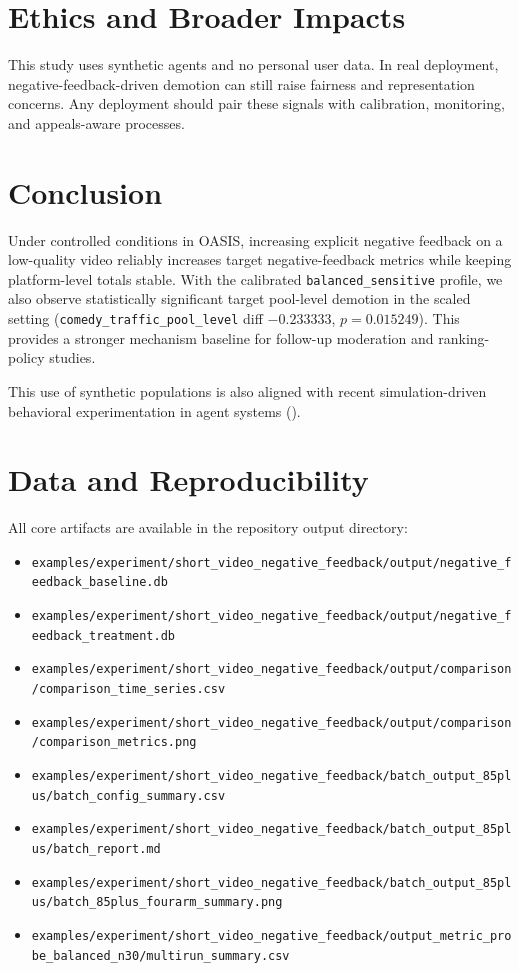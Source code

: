 \documentclass[11pt]{article}
\begin{document}
\section{Ethics and Broader Impacts}
This study uses synthetic agents and no personal user data. In real deployment,
negative-feedback-driven demotion can still raise fairness and representation
concerns. Any deployment should pair these signals with calibration, monitoring,
and appeals-aware processes.

\section{Conclusion}
Under controlled conditions in OASIS, increasing explicit negative feedback on a
low-quality video reliably increases target negative-feedback metrics while
keeping platform-level totals stable. With the calibrated
\texttt{balanced\_sensitive} profile, we also observe statistically significant
target pool-level demotion in the scaled setting
(\texttt{comedy\_traffic\_pool\_level} diff $-0.233333$, $p=0.015249$). This
provides a stronger mechanism baseline for follow-up moderation and
ranking-policy studies.

This use of synthetic populations is also aligned with recent simulation-driven
behavioral experimentation in agent systems (\cite{park2023generative}).

\section{Data and Reproducibility}
All core artifacts are available in the repository output directory:
\begin{itemize}
\item \texttt{examples/experiment/short\_video\_negative\_feedback/output/negative\_feedback\_baseline.db}
\item \texttt{examples/experiment/short\_video\_negative\_feedback/output/negative\_feedback\_treatment.db}
\item \texttt{examples/experiment/short\_video\_negative\_feedback/output/comparison/comparison\_time\_series.csv}
\item \texttt{examples/experiment/short\_video\_negative\_feedback/output/comparison/comparison\_metrics.png}
\item \texttt{examples/experiment/short\_video\_negative\_feedback/batch\_output\_85plus/batch\_config\_summary.csv}
\item \texttt{examples/experiment/short\_video\_negative\_feedback/batch\_output\_85plus/batch\_report.md}
\item \texttt{examples/experiment/short\_video\_negative\_feedback/batch\_output\_85plus/batch\_85plus\_fourarm\_summary.png}
\item \texttt{examples/experiment/short\_video\_negative\_feedback/output\_metric\_probe\_balanced\_n30/multirun\_summary.csv}
\end{itemize}
\end{document}
